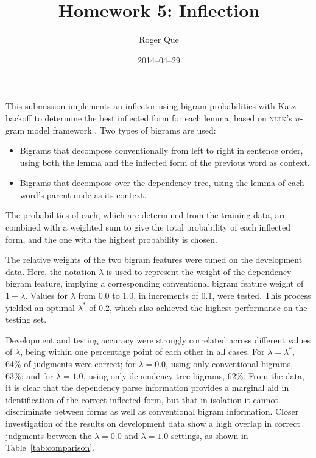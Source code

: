 \documentclass[11pt,twocolumn]{article}
\begin{document}
\title{Homework 5: Inflection}
\author{Roger Que}
\date{2014--04--29}
\maketitle

This submission implements an inflector using bigram probabilities with
Katz backoff to determine the best inflected form for each lemma, based
on \textsc{nltk}'s $n$-gram model framework \cite{Bird:2009}.
Two types of bigrams are used:
\begin{itemize}
\item
Bigrams that decompose conventionally from left to right in sentence
order, using both the lemma and the inflected form of the previous word
as context.

\item
Bigrams that decompose over the dependency tree, using the lemma of each
word's parent node as its context.
\end{itemize}
The probabilities of each, which are determined from the training data,
are combined with a weighted sum to give the total probability of each
inflected form, and the one with the highest probability is chosen.

The relative weights of the two bigram features were tuned on the
development data.
Here, the notation $\lambda$ is used to represent the weight of the
dependency bigram feature, implying a corresponding conventional bigram
feature weight of $1-\lambda$.
Values for $\lambda$ from 0.0 to 1.0, in increments of 0.1, were tested.
This process yielded an optimal $\lambda^*$ of 0.2, which also achieved
the highest performance on the testing set.

Development and testing accuracy were strongly correlated across
different values of $\lambda$, being within one percentage point of each
other in all cases.
For $\lambda=\lambda^*$, 64\% of judgments were correct;
for $\lambda=0.0$, using only conventional bigrams, 63\%;
and for $\lambda=1.0$, using only dependency tree bigrams, 62\%.
From the data, it is clear that the dependency parse information
provides a marginal aid in identification of the correct inflected form,
but that in isolation it cannot discriminate between forms as well as
conventional bigram information.
Closer investigation of the results on development data show a high
overlap in correct judgments between the $\lambda=0.0$ and $\lambda=1.0$
settings, as shown in Table~\ref{tab:comparison}.
\end{document}
